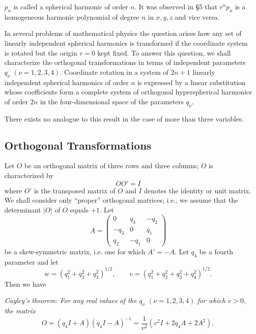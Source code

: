 $p_n$ is called a spherical harmonic of order $n$. It was observed in \S5 that $r^np_n$ is a homogeneous harmonic polynomial of degree $n$ in $x,y,z$ and vice versa.

In several problems of mathematical physics the question arises how any set of linearly independent spherical harmonics is transformed if the coordinate system is rotated but the origin $r=0$ kept fixed. To answer this question, we shall characterize the orthogonal transformations in terms of independent parameters $q_\nu$ $(\nu=1,2,3,4)$. Coordinate rotation in a system of $2n+1$ linearly independent spherical harmonics of order $n$ is expressed by a linear substitution whose coefficients form a complete system of orthogonal hyperspherical harmonics of order $2n$ in the four-dimensional space of the parameters $q_\nu$.

There exists no analogue to this result in the case of more than three variables.

\subsection{Orthogonal Transformations}
Let $O$ be an orthogonal matrix of three rows and three columns; $O$ is characterized by
\begin{equation}\tag{102}
OO'=I
\end{equation}
where $O'$ is the transposed matrix of $O$ and $I$ denotes the identity or unit matrix. We shall consider only ``proper'' orthogonal matrices; i.e., we assume that the determinant $|O|$ of $O$ equals $+1$. Let
\begin{equation}\tag{103}
A=\begin{pmatrix}
0&q_3&-q_2\\
-q_3&0&q_1\\
q_2&-q_1&0
\end{pmatrix}
\end{equation}
be a skew-symmetric matrix, i.e. one for which $A'=-A$. Let $q_4$ be a fourth parameter and let
\begin{equation}\tag{104}
w=(q_1^2+q_2^2+q_3^2)^{1/2},\qquad
v=(q_1^2+q_2^2+q_3^2+q_4^2)^{1/2}.
\end{equation}
Then we have

\emph{Cayley's theorem: For any real values of the $q_\nu$ $(\nu=1,2,3,4)$ for which $v>0$, the matrix}
\begin{equation}\tag{105}
O=(q_4I+A)(q_4I-A)^{-1}
=\frac1{v^2}(v^2I+2q_4A+2A^2),
\end{equation}

